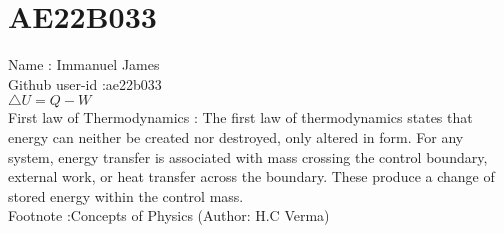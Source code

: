\documentclass[10pt,a4paper]{book}
\begin{document}
\section{AE22B033}
Name : Immanuel James \\
Github user-id :ae22b033\\

$ \triangle U= Q - W$ \\ 
First law of Thermodynamics : The first law of thermodynamics states that energy can neither be created nor destroyed, only altered in form.
For any system, energy transfer is associated with mass crossing the control boundary, external work, or heat transfer across the boundary.
These produce a change of stored energy within the control mass.
\\
Footnote :Concepts of Physics (Author: H.C Verma)  
\end{document}
